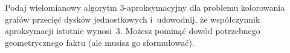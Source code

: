 \begin{zadanie}
	Podaj wielomianowy algorytm $3$-aproksymacyjny dla problemu kolorowania grafów
	przecięć dysków jednostkowych i~udowodnij, że współczynnik aproksymacji
	istotnie wynosi~$3$. Możesz pominąć dowód potrzebnego geometrycznego faktu
	(ale musisz go sformułować).
\end{zadanie}
